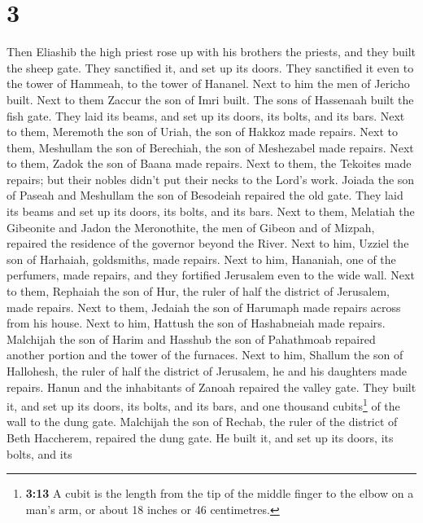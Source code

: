 \hypertarget{section-2}{%
\section{3}\label{section-2}}

 Then Eliashib the high priest rose up with his brothers
the priests, and they built the sheep gate. They sanctified it, and set
up its doors. They sanctified it even to the tower of Hammeah, to the
tower of Hananel.  Next to him the men of Jericho built.
Next to them Zaccur the son of Imri built.  The sons of
Hassenaah built the fish gate. They laid its beams, and set up its
doors, its bolts, and its bars.  Next to them, Meremoth
the son of Uriah, the son of Hakkoz made repairs. Next to them,
Meshullam the son of Berechiah, the son of Meshezabel made repairs. Next
to them, Zadok the son of Baana made repairs.  Next to
them, the Tekoites made repairs; but their nobles didn't put their necks
to the Lord's work.  Joiada the son of Paseah and
Meshullam the son of Besodeiah repaired the old gate. They laid its
beams and set up its doors, its bolts, and its bars.  Next
to them, Melatiah the Gibeonite and Jadon the Meronothite, the men of
Gibeon and of Mizpah, repaired the residence of the governor beyond the
River.  Next to him, Uzziel the son of Harhaiah,
goldsmiths, made repairs. Next to him, Hananiah, one of the perfumers,
made repairs, and they fortified Jerusalem even to the wide wall.
 Next to them, Rephaiah the son of Hur, the ruler of half
the district of Jerusalem, made repairs.  Next to them,
Jedaiah the son of Harumaph made repairs across from his house. Next to
him, Hattush the son of Hashabneiah made repairs. 
Malchijah the son of Harim and Hasshub the son of Pahathmoab repaired
another portion and the tower of the furnaces.  Next to
him, Shallum the son of Hallohesh, the ruler of half the district of
Jerusalem, he and his daughters made repairs.  Hanun and
the inhabitants of Zanoah repaired the valley gate. They built it, and
set up its doors, its bolts, and its bars, and one thousand
cubits\footnote{\textbf{3:13} A cubit is the length from the tip of the
  middle finger to the elbow on a man's arm, or about 18 inches or 46
  centimetres.} of the wall to the dung gate.  Malchijah
the son of Rechab, the ruler of the district of Beth Haccherem, repaired
the dung gate. He built it, and set up its doors, its bolts, and its
